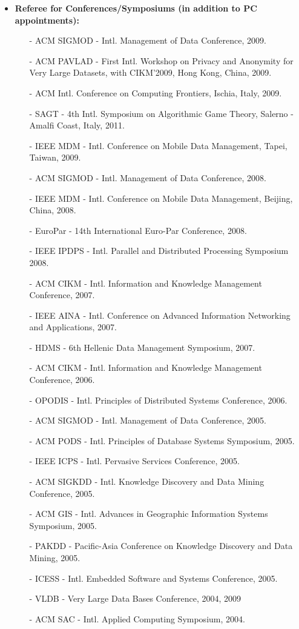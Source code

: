 \documentclass[10pt]{article}
\begin{document}
\begin{itemize}
\item {\bf Referee for Conferences/Symposiums (in addition to PC appointments):}
\begin{itemize}
\setlength{\itemsep}{0.10ex}
\item[-] ACM SIGMOD - Intl. Management of Data Conference, 2009.
\item[-] ACM PAVLAD - First Intl. Workshop on Privacy and Anonymity for Very Large Datasets, with CIKM'2009, Hong Kong, China, 2009.
\item[-] ACM Intl. Conference on Computing Frontiers, Ischia, Italy, 2009.
\item[-] SAGT - 4th Intl. Symposium on Algorithmic Game Theory, Salerno - Amalfi Coast, Italy, 2011.
\item[-] IEEE MDM - Intl. Conference on Mobile Data Management, Tapei, Taiwan, 2009.
\item[-] ACM SIGMOD - Intl. Management of Data Conference, 2008.
\item[-] IEEE MDM - Intl. Conference on Mobile Data Management, Beijing, China, 2008.
\item[-] EuroPar - 14th International Euro-Par Conference, 2008.
\item[-] IEEE IPDPS -  Intl. Parallel and Distributed Processing Symposium 2008.
\item[-] ACM CIKM - Intl. Information and Knowledge Management Conference,  2007.
\item[-] IEEE AINA - Intl. Conference on Advanced Information Networking and Applications, 2007.
\item[-] HDMS - 6th Hellenic Data Management Symposium, 2007.
\item[-] ACM CIKM - Intl. Information and Knowledge Management Conference, 2006.
\item[-] OPODIS -  Intl. Principles of Distributed Systems Conference, 2006.
\item[-] ACM SIGMOD - Intl. Management of Data Conference, 2005.
\item[-] ACM PODS - Intl. Principles of Database Systems Symposium, 2005.
\item[-] IEEE ICPS - Intl. Pervasive Services Conference,  2005.
\item[-] ACM SIGKDD - Intl. Knowledge Discovery and Data Mining Conference, 2005.
\item[-] ACM GIS - Intl. Advances in Geographic Information Systems Symposium, 2005.
\item[-] PAKDD - Pacific-Asia Conference on Knowledge Discovery and Data Mining, 2005.
\item[-] ICESS - Intl. Embedded Software and Systems Conference, 2005.
\item[-] VLDB - Very Large Data Bases  Conference, 2004, 2009
\item[-] ACM SAC - Intl. Applied Computing Symposium, 2004.
\end{itemize}


\end{itemize}
\end{document}
